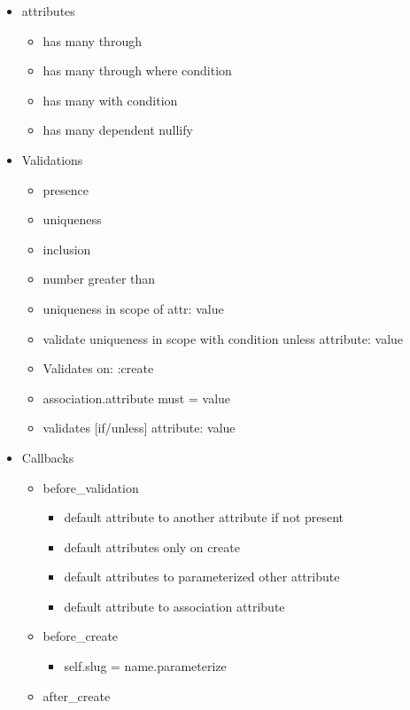 \documentclass[
  12pt,
]{article}
\providecommand{\tightlist}{%
  \setlength{\itemsep}{0pt}\setlength{\parskip}{0pt}}
\begin{document}
\begin{itemize}
\tightlist
\item
  attributes

  \begin{itemize}
  \tightlist
  \item
    has many through
  \item
    has many through where condition
  \item
    has many with condition
  \item
    has many dependent nullify
  \end{itemize}
\item
  Validations

  \begin{itemize}
  \tightlist
  \item
    presence
  \item
    uniqueness
  \item
    inclusion
  \item
    number greater than
  \item
    uniqueness in scope of attr: value
  \item
    validate uniqueness in scope with condition unless attribute: value
  \item
    Validates on: :create
  \item
    association.attribute must = value
  \item
    validates {[}if/unless{]} attribute: value
  \end{itemize}
\item
  Callbacks

  \begin{itemize}
  \tightlist
  \item
    before\_validation

    \begin{itemize}
    \tightlist
    \item
      default attribute to another attribute if not present
    \item
      default attributes only on create
    \item
      default attributes to parameterized other attribute
    \item
      default attribute to association attribute
    \end{itemize}
  \item
    before\_create

    \begin{itemize}
    \tightlist
    \item
      self.slug = name.parameterize
    \end{itemize}
  \item
    after\_create


\end{itemize}
\end{itemize}
\end{document}
